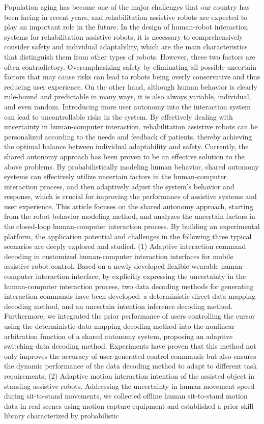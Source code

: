 \begin{abstract*}
Population aging has become one of the major challenges that our country has been facing in recent years, and rehabilitation assistive robots are expected to play an important role in the future. In the design of human-robot interaction systems for rehabilitation assistive robots, it is necessary to comprehensively consider safety and individual adaptability, which are the main characteristics that distinguish them from other types of robots. However, these two factors are often contradictory. Overemphasizing safety by eliminating all possible uncertain factors that may cause risks can lead to robots being overly conservative and thus reducing user experience. On the other hand, although human behavior is clearly rule-bound and predictable in many ways, it is also always variable, individual, and even random. Introducing more user autonomy into the interaction system can lead to uncontrollable risks in the system. By effectively dealing with uncertainty in human-computer interaction, rehabilitation assistive robots can be personalized according to the needs and feedback of patients, thereby achieving the optimal balance between individual adaptability and safety. Currently, the shared autonomy approach has been proven to be an effective solution to the above problems. By probabilistically modeling human behavior, shared autonomy systems can effectively utilize uncertain factors in the human-computer interaction process, and then adaptively adjust the system's behavior and response, which is crucial for improving the performance of assistive systems and user experience. This article focuses on the shared autonomy approach, starting from the robot behavior modeling method, and analyzes the uncertain factors in the closed-loop human-computer interaction process. By building an experimental platform, the application potential and challenges in the following three typical scenarios are deeply explored and studied. (1) Adaptive interaction command decoding in customized human-computer interaction interfaces for mobile assistive robot control. Based on a newly developed flexible wearable human-computer interaction interface, by explicitly expressing the uncertainty in the human-computer interaction process, two data decoding methods for generating interaction commands have been developed: a deterministic direct data mapping decoding method, and an uncertain intention inference decoding method. Furthermore, we integrated the prior performance of users controlling the cursor using the deterministic data mapping decoding method into the nonlinear arbitration function of a shared autonomy system, proposing an adaptive switching data decoding method. Experiments have proven that this method not only improves the accuracy of user-generated control commands but also ensures the dynamic performance of the data decoding method to adapt to different task requirements; (2) Adaptive motion interaction intention of the assisted object in standing assistive robots. Addressing the uncertainty in human movement speed during sit-to-stand movements, we collected offline human sit-to-stand motion data in real scenes using motion capture equipment and established a prior skill library characterized by probabilistic 
\end{abstract*}
